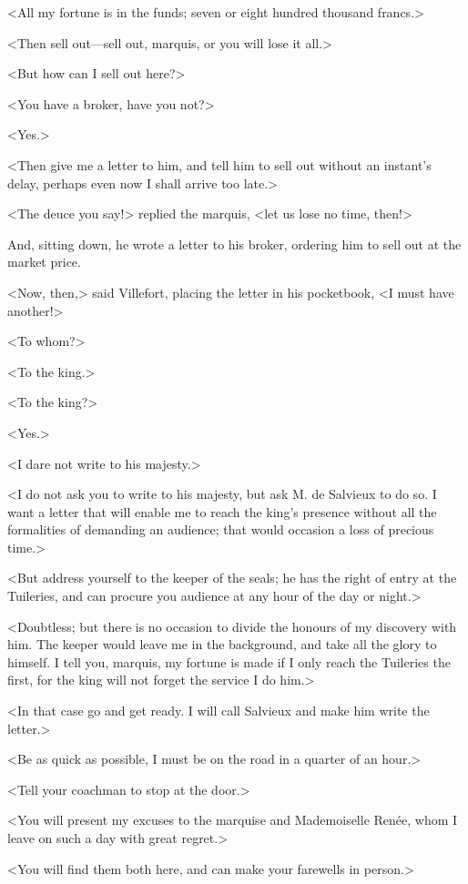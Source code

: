 <All my fortune is in the funds; seven or eight hundred thousand francs.> 

 <Then sell out—sell out, marquis, or you will lose it all.>

<But how can I sell out here?> 

 <You have a broker, have you not?> 

 <Yes.> 

 <Then give me a letter to him, and tell him to sell out without an instant's delay, perhaps even now I shall arrive too late.> 

 <The deuce you say!> replied the marquis, <let us lose no time, then!> 

 And, sitting down, he wrote a letter to his broker, ordering him to sell out at the market price. 

 <Now, then,> said Villefort, placing the letter in his pocketbook, <I must have another!> 

 <To whom?> 

 <To the king.> 

 <To the king?> 

 <Yes.> 

 <I dare not write to his majesty.> 

 <I do not ask you to write to his majesty, but ask M. de Salvieux to do so. I want a letter that will enable me to reach the king's presence without all the formalities of demanding an audience; that would occasion a loss of precious time.> 

 <But address yourself to the keeper of the seals; he has the right of entry at the Tuileries, and can procure you audience at any hour of the day or night.> 

 <Doubtless; but there is no occasion to divide the honours of my discovery with him. The keeper would leave me in the background, and take all the glory to himself. I tell you, marquis, my fortune is made if I only reach the Tuileries the first, for the king will not forget the service I do him.> 

 <In that case go and get ready. I will call Salvieux and make him write the letter.> 

 <Be as quick as possible, I must be on the road in a quarter of an hour.> 

 <Tell your coachman to stop at the door.> 

 <You will present my excuses to the marquise and Mademoiselle Renée, whom I leave on such a day with great regret.> 

 <You will find them both here, and can make your farewells in person.> 

